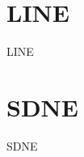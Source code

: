 \documentclass{beamer}
\begin{document}
\section{LINE}
\begin{frame}{LINE}
    
\end{frame}
\section{SDNE}
\begin{frame}{SDNE}
    
\end{frame}
\end{document}
